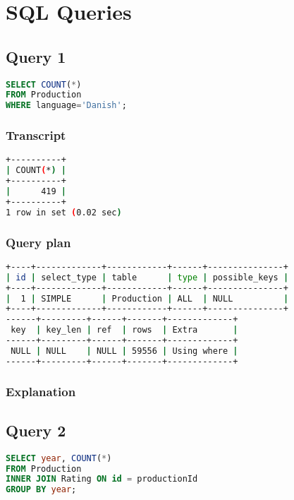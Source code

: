 \lstset{
	basicstyle=\tiny
}

\section{SQL Queries}
\subsection{Query 1}
\begin{lstlisting}[language=sql]
SELECT COUNT(*)
FROM Production
WHERE language='Danish';
\end{lstlisting}

\subsubsection{Transcript}
\begin{lstlisting}[language=bash]
+----------+
| COUNT(*) |
+----------+
|      419 |
+----------+
1 row in set (0.02 sec)
\end{lstlisting}

\subsubsection{Query plan}
\begin{lstlisting}[language=bash]
+----+-------------+------------+------+---------------+
| id | select_type | table      | type | possible_keys |
+----+-------------+------------+------+---------------+
|  1 | SIMPLE      | Production | ALL  | NULL          |
+----+-------------+------------+------+---------------+
------+---------+------+-------+-------------+
 key  | key_len | ref  | rows  | Extra       |
------+---------+------+-------+-------------+
 NULL | NULL    | NULL | 59556 | Using where |
------+---------+------+-------+-------------+
\end{lstlisting}

\subsubsection{Explanation}


\subsection{Query 2}
\begin{lstlisting}[language=sql]
SELECT year, COUNT(*)
FROM Production
INNER JOIN Rating ON id = productionId
GROUP BY year;
\end{lstlisting}

